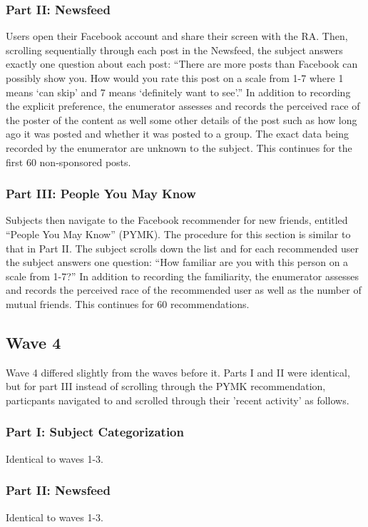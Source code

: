 \documentclass[12pt,letterpaper]{article}
\begin{document}
\subsubsection{Part II: Newsfeed} Users open their Facebook account and share their screen with the RA. Then, scrolling sequentially through each post in the Newsfeed, the subject answers exactly one question about each post: “There are more posts than Facebook can possibly show you. How would you rate this post on a scale from 1-7 where 1 means ‘can skip’ and 7 means ‘definitely want to see’.” In addition to recording the explicit preference, the enumerator assesses and records the perceived race of the poster of the content as well some other details of the post such as how long ago it was posted and whether it was posted to a group. The exact data being recorded by the enumerator are unknown to the subject. This continues for the first 60 non-sponsored posts.

\subsubsection{Part III: People You May Know} Subjects then navigate to the Facebook recommender for new friends, entitled “People You May Know” (PYMK). The procedure for this section is similar to that in Part II. The subject scrolls down the list and for each recommended user the subject answers one question: “How familiar are you with this person on a scale from 1-7?” In addition to recording the familiarity, the enumerator assesses and records the perceived race of the recommended user as well as the number of mutual friends. This continues for 60 recommendations.

\subsection{Wave 4}

Wave 4 differed slightly from the waves before it. Parts I and II were identical, but for part III instead of scrolling through the PYMK recommendation, particpants navigated to and scrolled through their 'recent activity' as follows.

\subsubsection{Part I: Subject Categorization} Identical to waves 1-3.

\subsubsection{Part II: Newsfeed} Identical to waves 1-3.
\end{document}
